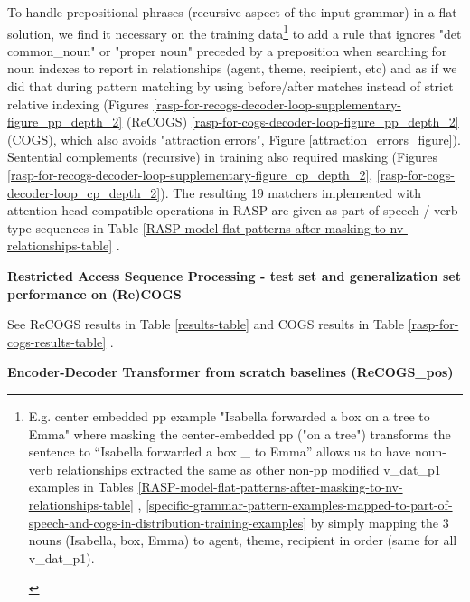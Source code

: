 \documentclass[11pt]{article}
\begin{document}
To handle prepositional phrases (recursive aspect of the input grammar) in a flat solution, we find it necessary on the training data\footnote{\begin{footnotesize}E.g. center embedded pp example "Isabella forwarded a box on a tree to Emma" where masking the center-embedded pp ("on a tree") transforms the sentence to “Isabella forwarded a box \_ to Emma” allows us to have noun-verb relationships extracted the same as other non-pp modified v\_dat\_p1 examples in Tables \ref{RASP-model-flat-patterns-after-masking-to-nv-relationships-table} , \ref{specific-grammar-pattern-examples-mapped-to-part-of-speech-and-cogs-in-distribution-training-examples} by simply mapping the 3 nouns (Isabella, box, Emma) to agent, theme, recipient in order (same for all v\_dat\_p1).\end{footnotesize}} to add a rule that ignores "det common\_noun" or "proper noun" preceded by a preposition when searching for noun indexes to report in relationships (agent, theme, recipient, etc) and as if we did that during pattern matching by using before/after matches instead of strict relative indexing (Figures \ref{rasp-for-recogs-decoder-loop-supplementary-figure_pp_depth_2} (ReCOGS) \ref{rasp-for-cogs-decoder-loop-figure_pp_depth_2} (COGS), which also avoids "attraction errors", Figure \ref{attraction_errors_figure}). Sentential complements (recursive) in training also required masking (Figures \ref{rasp-for-recogs-decoder-loop-supplementary-figure_cp_depth_2}, \ref{rasp-for-cogs-decoder-loop_cp_depth_2}). The resulting 19 matchers implemented with attention-head compatible operations in RASP are given as part of speech / verb type sequences in Table \ref{RASP-model-flat-patterns-after-masking-to-nv-relationships-table} .


\textbf{ Restricted Access Sequence Processing - test set and generalization set performance on (Re)COGS}

See ReCOGS results in Table \ref{results-table} and COGS results in Table \ref{rasp-for-cogs-results-table} .

\textbf{\cite{Wu2023} Encoder-Decoder Transformer from scratch baselines (ReCOGS\_pos)}
\end{document}
